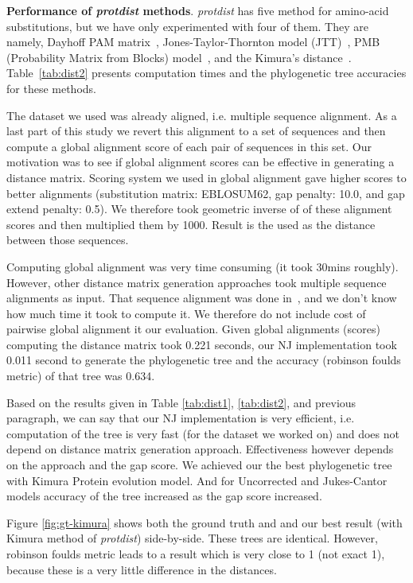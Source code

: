 \documentclass[11pt,letterpaper]{article}
\theoremstyle{definition}
\begin{document}
\textbf{Performance of \textit{protdist} methods}. \textit{protdist} has five method for amino-acid substitutions, but we have only experimented with four of them. They are namely, Dayhoff PAM matrix~\cite{kosiol2005different}, Jones-Taylor-Thornton model (JTT)~\cite{jones1992rapid}, PMB (Probability Matrix from Blocks) model~\cite{veerassamy2003transition}, and the Kimura's distance~\cite{kimura1983rare}. Table~\ref{tab:dist2} presents computation times and the phylogenetic tree accuracies for these methods.

The dataset we used was already aligned, i.e. multiple sequence alignment. As a last part of this study we revert this alignment to a set of sequences and then compute a global alignment score of each pair of sequences in this set. Our motivation was to see if global alignment scores can be effective in generating a distance matrix. Scoring system we used in global alignment gave higher scores to better alignments (substitution matrix: EBLOSUM62, gap penalty: 10.0, and gap extend penalty: 0.5). We therefore took geometric inverse of of these alignment scores and then multiplied them by 1000. Result is the used as the distance between those sequences.

Computing global alignment was very time consuming (it took 30mins roughly). However, other distance matrix generation approaches took multiple sequence alignments as input. That sequence alignment was done in~\cite{khafif2014identification}, and we don't know how much time it took to compute it. We therefore do not include cost of pairwise global alignment it our evaluation. Given global alignments (scores) computing the distance matrix took 0.221 seconds, our NJ implementation took 0.011 second to generate the phylogenetic tree and the accuracy (robinson foulds metric) of that tree was 0.634.

Based on the results given in Table \ref{tab:dist1}, \ref{tab:dist2}, and previous paragraph, we can say that our NJ implementation is very efficient, i.e. computation of the tree is very fast (for the dataset we worked on) and does not depend on distance matrix generation approach. Effectiveness however depends on the approach and the gap score. We achieved our the best phylogenetic tree with Kimura Protein evolution model. And for Uncorrected and Jukes-Cantor models accuracy of the tree increased as the gap score increased.

Figure \ref{fig:gt-kimura} shows both the ground truth and and our best result (with Kimura method of \textit{protdist}) side-by-side. These trees are identical. However, robinson foulds metric leads to a result which is very close to 1 (not exact 1), because these is a very little difference in the distances.
\end{document}
